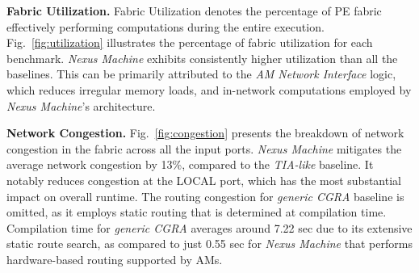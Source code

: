 
{\bf Fabric Utilization.} 
Fabric Utilization denotes the percentage of PE fabric effectively performing computations during the entire execution.
Fig.~\ref{fig:utilization} illustrates the percentage of fabric utilization for each benchmark. \textit{Nexus Machine} exhibits consistently higher utilization than all the baselines. This can be primarily attributed to the \textit{AM Network Interface} logic, which reduces irregular memory loads, and in-network computations employed by \textit{Nexus Machine}'s architecture.

{\bf Network Congestion.}
Fig.~\ref{fig:congestion} presents the breakdown of network congestion in the fabric across all the input ports. \textit{Nexus Machine} mitigates the average network congestion by 13\%, compared to the \textit{TIA-like} baseline. It notably reduces congestion at the LOCAL port, which has the most substantial impact on overall runtime.
The routing congestion for \textit{generic CGRA} baseline is omitted, as it employs static routing that is determined at compilation time.
Compilation time for \textit{generic CGRA} averages around 7.22 sec due to its extensive static route search, as compared to just 0.55 sec for \textit{Nexus Machine} that performs hardware-based routing supported by AMs.

